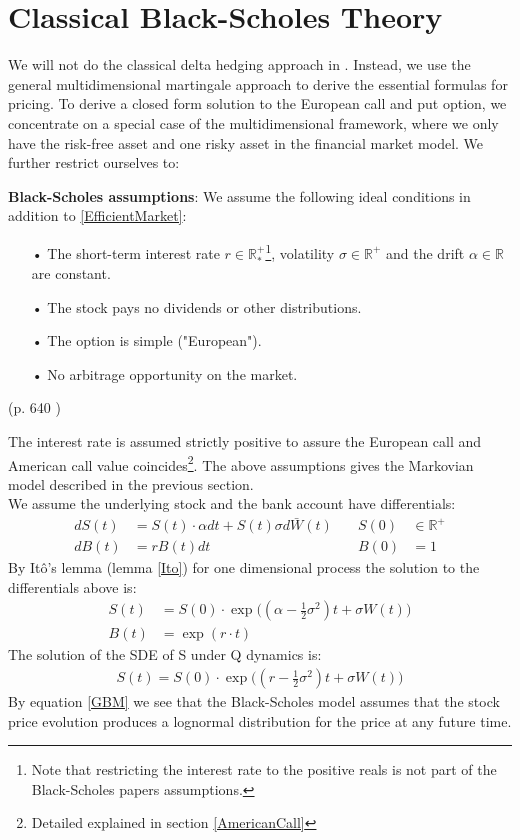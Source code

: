 \section{Classical Black-Scholes Theory}\label{classicBS}
We will not do the classical delta hedging approach in \parencite{B-S-Paper}. Instead, we use the general multidimensional martingale approach to derive the essential formulas for pricing. 
To derive a closed form solution to the European call and put option, we concentrate on a special case of the multidimensional framework, where we only have the risk-free asset and one risky asset in the financial market model. 
We further restrict ourselves to:
\theoremstyle{assumption}
\begin{assumption}{\textbf{Black-Scholes assumptions}:}\label{BS-Assumption}
We assume the following ideal conditions in addition to \eqref{EfficientMarket}:
\begin{enumerate}
\item[•] The short-term interest rate $r\in \mathbb{R}^+_*$\footnote{Note that restricting the interest rate to the positive reals is not part of the Black-Scholes papers assumptions.}, volatility $\sigma \in \mathbb{R}^+$ and the drift $\alpha\in \mathbb{R}$ are constant.
\item[•] The stock pays no dividends or other distributions.
\item[•] The option is simple ("European").
\item[•] No arbitrage opportunity on the market.
\end{enumerate}
\null \hfill (p. 640 \parencite{B-S-Paper})
\end{assumption}
The interest rate is assumed strictly positive to assure the European call and American call value coincides\footnote{Detailed explained in section \ref{AmericanCall}}. The above assumptions gives the Markovian model described in the previous section. \\

We assume the underlying stock and the bank account have differentials:
\begin{align*}
dS(t)&=S(t)\cdot \alpha dt+S(t) \sigma d\bar{W}(t) \quad & S(0) &\in \mathbb{R}^+ \\
dB(t)&=r B(t)dt \quad & B(0) &= 1
\end{align*}
By Itô's lemma (lemma \ref{Ito}) for one dimensional process the solution to the differentials above is:
\begin{align*}
S(t)&=S(0) \cdot \exp \bigg( (\alpha -\frac{1}{2} \sigma^2) t + \sigma W(t) \bigg) \\
B(t)&=\exp(r\cdot t)
\end{align*}
The solution of the SDE of S under Q dynamics is:
\begin{equation}\label{GBM}
\begin{split}
S(t)=S(0) \cdot \exp \bigg( (r -\frac{1}{2} \sigma^2) t + \sigma W(t) \bigg)
\end{split}
\end{equation}
By equation \eqref{GBM} we see that the Black-Scholes model assumes that the stock price evolution produces a lognormal distribution for the price at any future time. \\

